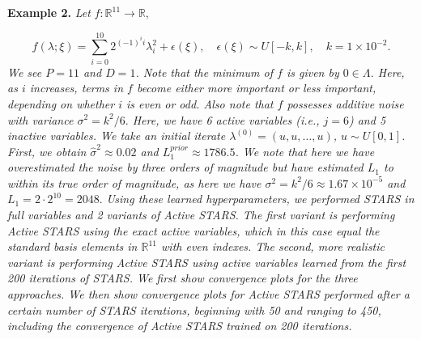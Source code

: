 \documentclass{amsart}
\newcommand{\R}{\mathbb{R}}
\begin{document}
\noindent \textbf{Example 2.} \textit{Let} $f: \R^{11} \to  \R,$  

$$f(\lambda; \xi)=\sum_{i=0}^{10} 2^{(-1)^i i}\lambda_i^2+\epsilon(\xi), \quad \epsilon(\xi) \sim U[-k,k], \quad k=1 \times 10^{-2}.$$ \textit{We see $P=11$ and $D=1$. Note that the minimum of $f$ is given by $0 \in \Lambda$. Here, as $i$ increases, terms in $f$ become either more important or less important, depending on whether $i$ is even or odd. Also note that $f$ possesses additive noise with variance $\sigma^2=k^2/6.$ Here, we have 6 active variables (i.e., $j=6$) and 5 inactive variables.  We take an initial iterate $\lambda^{(0)}=(u,u,\ldots,u)$, $u \sim U[0,1]$. First, we obtain $\hat{\sigma}^2 \approx 0.02$ and $L_1^{prior} \approx 1786.5$. We note that here we have overestimated the noise by three orders of magnitude but have estimated $L_1$ to within its true order of magnitude, as here we have $\sigma^2=k^2/6\approx 1.67\times10^{-5}$ and $L_1=2\cdot 2^{10}=2048.$ Using these learned hyperparameters, we performed STARS in full variables and 2 variants of Active STARS. The first variant is performing Active STARS using the exact active variables, which in this case equal the standard basis elements in $\R^{11}$ with even indexes. The second, more realistic variant is performing Active STARS using active variables learned from the first 200 iterations of STARS. We first show convergence plots for the three approaches.  We then show convergence plots for Active STARS performed after a certain number of STARS iterations, beginning with 50 and ranging to 450, including the convergence of Active STARS trained on 200 iterations. }
\end{document}
